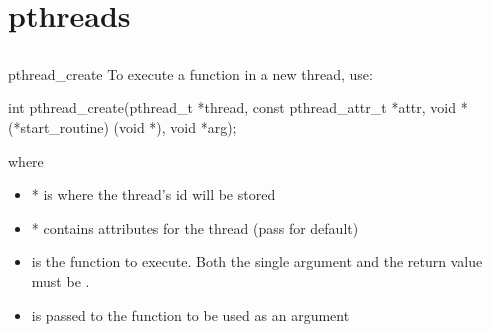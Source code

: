 \documentclass[10pt,graphics,aspectratio=169,table]{beamer}
\begin{document}
\section{pthreads}
\subsection{}
\begin{frame}[fragile]{pthread\_create}
    To execute a function in a new thread, use:
    \begin{codeblock}
int pthread_create(pthread_t *thread,
                   const pthread_attr_t *attr,
                   void *(*start_routine) (void *),
                   void *arg);
\end{codeblock}
    where
    \begin{itemize}
            \item * is where the thread's id will be stored
            \item * contains attributes for the thread (pass  for default)
            \item {} is the function to execute. Both the single argument and the return value must be .
            \item {} is passed to the function to be used as an argument
    \end{itemize}
\end{frame}
\end{document}
